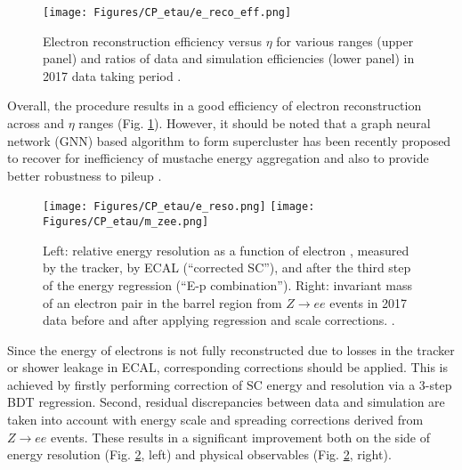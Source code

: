 \begin{figure}[t!]
    \centering
    \texttt{[image: Figures/CP\_etau/e\_reco\_eff.png]}
    \caption{Electron reconstruction efficiency versus $\eta$ for various \pt ranges (upper panel) and ratios of data and simulation efficiencies (lower panel) in 2017 data taking period \cite{CMS:2020uim}.}
    \label{fig:e-reco-eff}
\end{figure}

Overall, the procedure results in a good efficiency of electron reconstruction across \pt and $\eta$ ranges (Fig. \ref{fig:e-reco-eff}). However, it should be noted that a graph neural network (GNN) based algorithm to form supercluster has been recently proposed to recover for inefficiency of mustache energy aggregation and also to provide better robustness to pileup \cite{Valsecchi:2022rla, CMS-DP-2022-032}.

\begin{figure}[ht!]
    \centering
    \texttt{[image: Figures/CP\_etau/e\_reso.png]}
    \texttt{[image: Figures/CP\_etau/m\_zee.png]}
    \caption{Left: relative energy resolution as a function of electron \pt, measured by the tracker, by ECAL (\enquote{corrected SC}), and after the third step of the energy regression (\enquote{E-p combination}). Right: invariant mass of an electron pair in the barrel region from $Z\to ee$ events in 2017 data before and after applying regression and scale corrections. \cite{CMS:2020uim}.}
    \label{fig:e_corr}
\end{figure}

Since the energy of electrons is not fully reconstructed due to losses in the tracker or shower leakage in ECAL, corresponding corrections should be applied. This is achieved by firstly performing correction of SC energy and resolution via a 3-step BDT regression.  Second, residual discrepancies between data and simulation are taken into account with energy scale and spreading corrections derived from $Z \to ee$ events. These results in a significant improvement both on the side of energy resolution (Fig. \ref{fig:e_corr}, left) and physical observables (Fig. \ref{fig:e_corr}, right).

